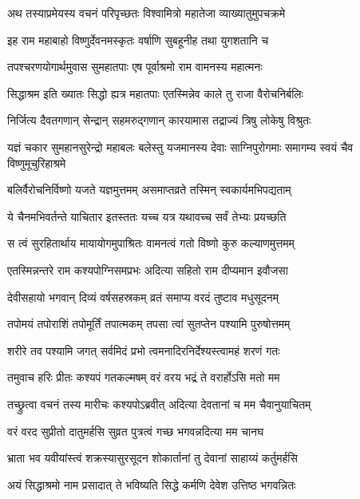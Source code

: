 
\twolineshloka
{अथ तस्याप्रमेयस्य वचनं परिपृच्छतः}
{विश्वामित्रो महातेजा व्याख्यातुमुपचक्रमे} %

\twolineshloka
{इह राम महाबाहो विष्णुर्देवनमस्कृतः}
{वर्षाणि सुबहूनीह तथा युगशतानि च} %

\twolineshloka
{तपश्चरणयोगार्थमुवास सुमहातपाः}
{एष पूर्वाश्रमो राम वामनस्य महात्मनः} %

\twolineshloka
{सिद्धाश्रम इति ख्यातः सिद्धो ह्यत्र महातपाः}
{एतस्मिन्नेव काले तु राजा वैरोचनिर्बलिः} %

\twolineshloka
{निर्जित्य दैवतगणान् सेन्द्रान् सहमरुद्गणान्}
{कारयामास तद्राज्यं त्रिषु लोकेषु विश्रुतः} %

\threelineshloka
{यज्ञं चकार सुमहानसुरेन्द्रो महाबलः}
{बलेस्तु यजमानस्य देवाः साग्निपुरोगमाः}
{समागम्य स्वयं चैव विष्णुमूचुरिहाश्रमे} %

\twolineshloka
{बलिर्वैरोचनिर्विष्णो यजते यज्ञमुत्तमम्}
{असमाप्तव्रते तस्मिन् स्वकार्यमभिपद्यताम्} %

\twolineshloka
{ये चैनमभिवर्तन्ते याचितार इतस्ततः}
{यच्च यत्र यथावच्च सर्वं तेभ्यः प्रयच्छति} %

\twolineshloka
{स त्वं सुरहितार्थाय मायायोगमुपाश्रितः}
{वामनत्वं गतो विष्णो कुरु कल्याणमुत्तमम्} %

\twolineshloka
{एतस्मिन्नन्तरे राम कश्यपोग्निसमप्रभः}
{अदित्या सहितो राम दीप्यमान इवौजसा} %

\twolineshloka
{देवीसहायो भगवान् दिव्यं वर्षसहस्रकम्}
{व्रतं समाप्य वरदं तुष्टाव मधुसूदनम्} %

\twolineshloka
{तपोमयं तपोराशिं तपोमूर्तिं तपात्मकम्}
{तपसा त्वां सुतप्तेन पश्यामि पुरुषोत्तमम्} %

\twolineshloka
{शरीरे तव पश्यामि जगत् सर्वमिदं प्रभो}
{त्वमनादिरनिर्देश्यस्त्वामहं शरणं गतः} %

\twolineshloka
{तमुवाच हरिः प्रीतः कश्यपं गतकल्मषम्}
{वरं वरय भद्रं ते वरार्होऽसि मतो मम} %

\twolineshloka
{तच्छ्रुत्वा वचनं तस्य मारीचः कश्यपोऽब्रवीत्}
{अदित्या देवतानां च मम चैवानुयाचितम्} %

\twolineshloka
{वरं वरद सुप्रीतो दातुमर्हसि सुव्रत}
{पुत्रत्वं गच्छ भगवन्नदित्या मम चानघ} %

\twolineshloka
{भ्राता भव यवीयांस्त्वं शक्रस्यासुरसूदन}
{शोकार्तानां तु देवानां साहाय्यं कर्तुमर्हसि} %

\twolineshloka
{अयं सिद्धाश्रमो नाम प्रसादात् ते भविष्यति}
{सिद्धे कर्मणि देवेश उत्तिष्ठ भगवन्नितः} %

